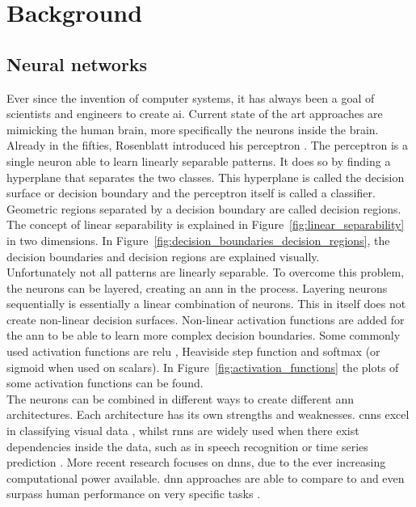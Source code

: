 \chapter{Background}
\section{Neural networks}
Ever since the invention of computer systems, it has always been a goal of scientists and engineers to create \gls{ai}. Current state of the art approaches are mimicking the human brain, more specifically the neurons inside the brain. Already in the fifties, Rosenblatt introduced his perceptron \cite{rosenblatt_perceptron_1958}. The perceptron is a single neuron able to learn linearly separable patterns. It does so by finding a hyperplane that separates the two classes. This hyperplane is called the decision surface or decision boundary and the perceptron itself is called a classifier. Geometric regions separated by a decision boundary are called decision regions. The concept of linear separability is explained in Figure~\ref{fig:linear_separability} in two dimensions. In Figure~\ref{fig:decision_boundaries_decision_regions}, the decision boundaries and decision regions are explained visually. \\

Unfortunately not all patterns are linearly separable. To overcome this problem, the neurons can be layered, creating an \gls{ann} in the process. Layering neurons sequentially is essentially a linear combination of neurons. This in itself does not create non-linear decision surfaces. Non-linear activation functions are added for the \gls{ann} to be able to learn more complex decision boundaries. Some commonly used activation functions are \gls{relu} \cite{relu}, Heaviside step function \cite{heaviside} and softmax \cite{softmax} (or sigmoid when used on scalars). In Figure~\ref{fig:activation_functions} the plots of some activation functions can be found.\\ 

The neurons can be combined in different ways to create different \gls{ann} architectures. Each architecture has its own strengths and weaknesses. \glspl{cnn} excel in classifying visual data \cite{cnn_1, cnn_2}, whilst \glspl{rnn} are widely used when there exist dependencies inside the data, such as in speech recognition \cite{speech_1, speech_2} or time series prediction \cite{time_series_1}. More recent research focuses on \glspl{dnn}, due to the ever increasing computational power available. \gls{dnn} approaches are able to compare to and even surpass human performance on very specific tasks \cite{alpha_go_google, imagenet_dnn}.\\ 

